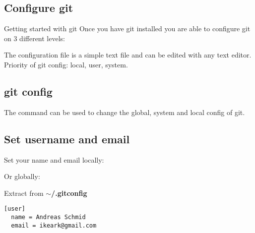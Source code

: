 \subsection{Configure git}
\begin{frame}[fragile]
  \subslidetitle
  \begin{block}{Getting started with git}
    Once you have git installed you are able to configure git on 3 different levels:
    \begin{itemize}
    \end{itemize}

    The configuration file is a simple text file and can be edited with any text editor.
    Priority of git config: local, user, system.
  \end{block}
\end{frame}

\subsection{git config}
\begin{frame}[fragile]
  \subslidetitle
  The command  can be used to change the global, system and local config of git.
  \begin{itemize}
  \end{itemize}
\end{frame}

\subsection{Set username and email}
\begin{frame}[fragile]
  \subslidetitle
  \vspace{1em}
  Set your name and email locally:
  \begin{itemize}
  \end{itemize}
  \vspace{1em}
  Or globally:
  \begin{itemize}
  \end{itemize}

  Extract from \bf{$\sim$/.gitconfig}
\begin{lstlisting}
[user]
  name = Andreas Schmid
  email = ikeark@gmail.com
\end{lstlisting}
\end{frame}

